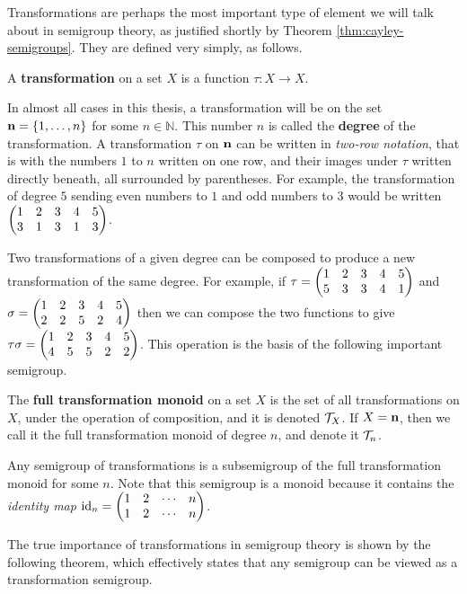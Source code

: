 Transformations are perhaps the most important type of element we will talk
about in semigroup theory, as justified shortly by Theorem
\ref{thm:cayley-semigroups}.  They are defined very simply, as follows.

\begin{definition}
  \label{def:transformation}
  A \textbf{transformation} on a set $X$ is a function $\tau: X \to X$.
\end{definition}

In almost all cases in this thesis, a transformation will be on the set
$\mathbf{n} = \{1, \ldots, n\}$ for some $n \in \mathbb{N}$.  This number $n$ is called
the \textbf{degree} of the transformation.  A transformation
$\tau$ on $\mathbf{n}$ can be written in \textit{two-row notation},  that is with the numbers $1$ to $n$ written on one row, and their
images under $\tau$ written directly beneath, all surrounded by parentheses.
For example, the transformation of degree $5$ sending even numbers to $1$ and
odd numbers to $3$ would be written $\begin{pmatrix} 1 & 2 & 3 & 4 & 5 \\ 3 & 1 & 3 & 1 & 3 \end{pmatrix}$.

Two transformations of a given degree can be composed to produce a new
transformation of the same degree.  For example, if $\tau = \begin{pmatrix} 1 & 2 & 3 & 4 & 5 \\ 5 & 3 & 3 & 4 & 1 \end{pmatrix}$ and
$\sigma = \begin{pmatrix} 1 & 2 & 3 & 4 & 5 \\ 2 & 2 & 5 & 2 & 4 \end{pmatrix}$ then we can compose the two functions to give
$\tau\sigma = \begin{pmatrix} 1 & 2 & 3 & 4 & 5 \\ 4 & 5 & 5 & 2 & 2 \end{pmatrix}$.  This operation is the basis of the following
important semigroup.

\begin{definition}
  \label{def:tn}
  The \textbf{full transformation monoid} on a set $X$ is the
  set of all transformations on $X$, under the operation of composition, and it
  is denoted $\mathcal{T}_X$.  If $X = \mathbf{n}$, then we call it the full transformation
  monoid of degree $n$, and denote it $\mathcal{T}_n$.
\end{definition}

Any semigroup of transformations is a subsemigroup of the full transformation
monoid for some $n$.  Note that this semigroup is a monoid because it contains
the \textit{identity map} $\operatorname{id}_n = \begin{pmatrix} 1 & 2 & \cdots & n \\ 1 & 2 & \cdots & n \end{pmatrix}$.

The true importance of transformations in semigroup theory is shown by the
following theorem, which effectively states that any semigroup can be viewed as
a transformation semigroup.

